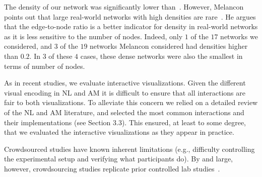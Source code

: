 The density of our network was significantly lower than~\cite{ghoniem2004comparison,keller2006matrices}.
However, Melancon points out that large real-world networks with high densities are rare~\cite{melancon2006just}. He argues that the edge-to-node ratio is a better indicator for density in real-world networks as it is less sensitive to the number of nodes. Indeed, only $1$ of the $17$ networks we considered, and $3$ of the $19$ networks Melancon considered had densities higher than $0.2$. In $3$ of these $4$ cases, these dense networks were also the smallest in terms of number of nodes.   

As in recent studies, we  evaluate interactive visualizations. Given the  different visual encoding in NL and AM it is difficult to ensure that all interactions are fair to both visualizations. To alleviate this concern 
we relied on a detailed review of the NL and AM literature, and selected the most common interactions and their implementations (see Section 3.3). This ensured, at least to some degree, that we evaluated the interactive visualizations as they appear in practice.

Crowdsourced studies have known inherent limitations (e.g., difficulty controlling the experimental setup and verifying what participants do). %
By and large, however, crowdsourcing studies replicate prior controlled lab studies~\cite{heer2010crowdsourcing}.



